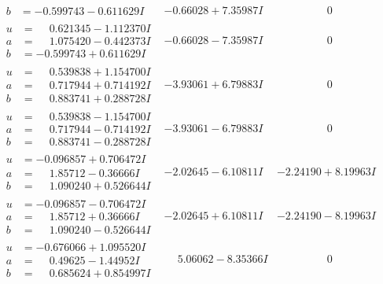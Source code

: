\documentclass[1p]{elsarticle_modified}
\theoremstyle{definition}
\begin{document}
$$\begin{array}{c|c|c}
\begin{aligned}
b &= -0.599743 - 0.611629 I\end{aligned}
 & -0.66028 + 7.35987 I & \phantom{-0.000000 } 0 \\ \hline\begin{aligned}
u &= \phantom{-}0.621345 - 1.112370 I \\
a &= \phantom{-}1.075420 - 0.442373 I \\
b &= -0.599743 + 0.611629 I\end{aligned}
 & -0.66028 - 7.35987 I & \phantom{-0.000000 } 0 \\ \hline\begin{aligned}
u &= \phantom{-}0.539838 + 1.154700 I \\
a &= \phantom{-}0.717944 + 0.714192 I \\
b &= \phantom{-}0.883741 + 0.288728 I\end{aligned}
 & -3.93061 + 6.79883 I & \phantom{-0.000000 } 0 \\ \hline\begin{aligned}
u &= \phantom{-}0.539838 - 1.154700 I \\
a &= \phantom{-}0.717944 - 0.714192 I \\
b &= \phantom{-}0.883741 - 0.288728 I\end{aligned}
 & -3.93061 - 6.79883 I & \phantom{-0.000000 } 0 \\ \hline\begin{aligned}
u &= -0.096857 + 0.706472 I \\
a &= \phantom{-}1.85712 - 0.36666 I \\
b &= \phantom{-}1.090240 + 0.526644 I\end{aligned}
 & -2.02645 - 6.10811 I & -2.24190 + 8.19963 I \\ \hline\begin{aligned}
u &= -0.096857 - 0.706472 I \\
a &= \phantom{-}1.85712 + 0.36666 I \\
b &= \phantom{-}1.090240 - 0.526644 I\end{aligned}
 & -2.02645 + 6.10811 I & -2.24190 - 8.19963 I \\ \hline\begin{aligned}
u &= -0.676066 + 1.095520 I \\
a &= \phantom{-}0.49625 - 1.44952 I \\
b &= \phantom{-}0.685624 + 0.854997 I\end{aligned}
 & \phantom{-}5.06062 - 8.35366 I & \phantom{-0.000000 } 0 \\ \hline\begin{aligned}

\end{aligned}
\end{array}$$
\end{document}
